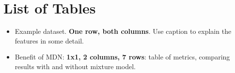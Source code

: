 \section{List of Tables}\label{sec:list_of_tables}
\begin{itemize}
    \item Example dataset. \textbf{One row, both columns}. Use caption to explain the features in some detail.
    \item Benefit of MDN: \textbf{1x1, 2 columns, 7 rows}: table of metrics, comparing results with and without mixture model.
\end{itemize}

